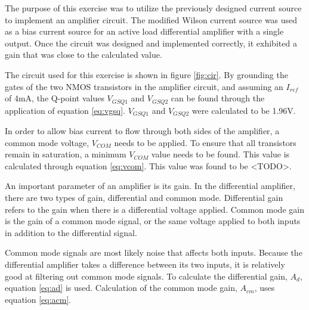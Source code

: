 
\def \labnum	{\#4}
\def \tonames   {Tyler Nicholson}
\def \disptitle	{MOSFET Differential Pair with Active Load}
\def \datestart	{04-03-2015}
\def \dateend	{04-17-2015}





The purpose of this exercise was to utilize the previously designed current source to implement an amplifier circuit. 
The modified Wilson current source was used as a bias current source for an active load differential amplifier with a single output. 
Once the circuit was designed and implemented correctly, it exhibited a gain that was close to the calculated value. 


The circuit used for this exercise is shown in figure \ref{fig:cir}. 
By grounding the gates of the two NMOS transistors in the amplifier circuit, and assuming an $I_{ref}$ of 4mA, the Q-point values $V_{GSQ1}$ and $V_{GSQ2}$ can be found through the application of equation \ref{eq:vgsq}.
$V_{GSQ1}$ and $V_{GSQ2}$ were calculated to be 1.96V. 


In order to allow bias current to flow through both sides of the amplifier, a common mode voltage, $V_{COM}$ needs to be applied. 
To ensure that all transistors remain in saturation, a minimum $V_{COM}$ value needs to be found. This value is calculated through equation \ref{eq:vcom}. This value was found to be <TODO>. 


	
An important parameter of an amplifier is its gain. In the differential amplifier, there are two types of gain, differential and common mode. Differential gain refers to the gain when there is a differential voltage applied. Common mode gain is the gain of a common mode signal, or the same voltage applied to both inputs in addition to the differential signal.

Common mode signals are most likely noise that affects both inputs. Because the differential amplifier takes a difference between its two inputs, it is relatively good at filtering out common mode signals. 
To calculate the differential gain, $A_d$, equation \ref{eq:ad} is used. Calculation of the common mode gain, $A_{cm}$, uses equation \ref{eq:acm}. 
	
